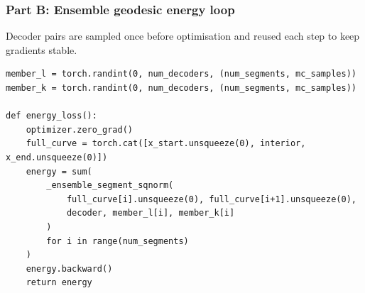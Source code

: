 \subsubsection*{Part B: Ensemble geodesic energy loop}
Decoder pairs are sampled once before optimisation and reused each step to keep gradients stable.
\begin{lstlisting}
member_l = torch.randint(0, num_decoders, (num_segments, mc_samples))
member_k = torch.randint(0, num_decoders, (num_segments, mc_samples))

def energy_loss():
    optimizer.zero_grad()
    full_curve = torch.cat([x_start.unsqueeze(0), interior, x_end.unsqueeze(0)])
    energy = sum(
        _ensemble_segment_sqnorm(
            full_curve[i].unsqueeze(0), full_curve[i+1].unsqueeze(0),
            decoder, member_l[i], member_k[i]
        )
        for i in range(num_segments)
    )
    energy.backward()
    return energy
\end{lstlisting}
